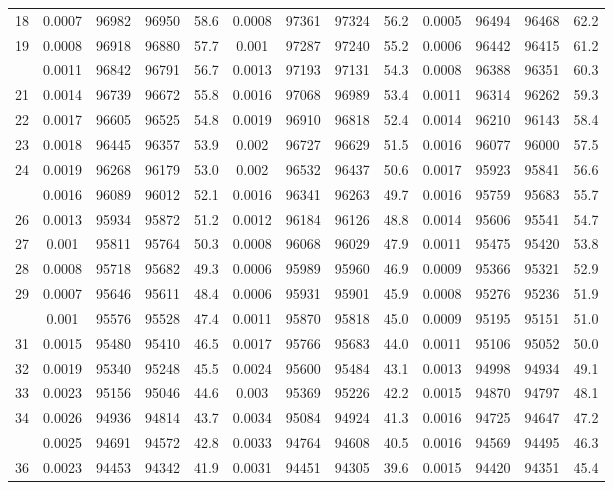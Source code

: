 \documentclass[
  14pt,
]{article}
\begin{document}
\begin{longtable}[t]{lcccccccccccc}
18 & 0.0007 & 96982 & 96950 & 58.6 & 0.0008 & 97361 & 97324 & 56.2 & 0.0005 & 96494 & 96468 & 62.2\\
19 & 0.0008 & 96918 & 96880 & 57.7 & 0.001 & 97287 & 97240 & 55.2 & 0.0006 & 96442 & 96415 & 61.2\\
\addlinespace
20 & 0.0011 & 96842 & 96791 & 56.7 & 0.0013 & 97193 & 97131 & 54.3 & 0.0008 & 96388 & 96351 & 60.3\\
21 & 0.0014 & 96739 & 96672 & 55.8 & 0.0016 & 97068 & 96989 & 53.4 & 0.0011 & 96314 & 96262 & 59.3\\
22 & 0.0017 & 96605 & 96525 & 54.8 & 0.0019 & 96910 & 96818 & 52.4 & 0.0014 & 96210 & 96143 & 58.4\\
23 & 0.0018 & 96445 & 96357 & 53.9 & 0.002 & 96727 & 96629 & 51.5 & 0.0016 & 96077 & 96000 & 57.5\\
24 & 0.0019 & 96268 & 96179 & 53.0 & 0.002 & 96532 & 96437 & 50.6 & 0.0017 & 95923 & 95841 & 56.6\\
\addlinespace
25 & 0.0016 & 96089 & 96012 & 52.1 & 0.0016 & 96341 & 96263 & 49.7 & 0.0016 & 95759 & 95683 & 55.7\\
26 & 0.0013 & 95934 & 95872 & 51.2 & 0.0012 & 96184 & 96126 & 48.8 & 0.0014 & 95606 & 95541 & 54.7\\
27 & 0.001 & 95811 & 95764 & 50.3 & 0.0008 & 96068 & 96029 & 47.9 & 0.0011 & 95475 & 95420 & 53.8\\
28 & 0.0008 & 95718 & 95682 & 49.3 & 0.0006 & 95989 & 95960 & 46.9 & 0.0009 & 95366 & 95321 & 52.9\\
29 & 0.0007 & 95646 & 95611 & 48.4 & 0.0006 & 95931 & 95901 & 45.9 & 0.0008 & 95276 & 95236 & 51.9\\
\addlinespace
30 & 0.001 & 95576 & 95528 & 47.4 & 0.0011 & 95870 & 95818 & 45.0 & 0.0009 & 95195 & 95151 & 51.0\\
31 & 0.0015 & 95480 & 95410 & 46.5 & 0.0017 & 95766 & 95683 & 44.0 & 0.0011 & 95106 & 95052 & 50.0\\
32 & 0.0019 & 95340 & 95248 & 45.5 & 0.0024 & 95600 & 95484 & 43.1 & 0.0013 & 94998 & 94934 & 49.1\\
33 & 0.0023 & 95156 & 95046 & 44.6 & 0.003 & 95369 & 95226 & 42.2 & 0.0015 & 94870 & 94797 & 48.1\\
34 & 0.0026 & 94936 & 94814 & 43.7 & 0.0034 & 95084 & 94924 & 41.3 & 0.0016 & 94725 & 94647 & 47.2\\
\addlinespace
35 & 0.0025 & 94691 & 94572 & 42.8 & 0.0033 & 94764 & 94608 & 40.5 & 0.0016 & 94569 & 94495 & 46.3\\
36 & 0.0023 & 94453 & 94342 & 41.9 & 0.0031 & 94451 & 94305 & 39.6 & 0.0015 & 94420 & 94351 & 45.4\\

\end{longtable}
\end{document}
